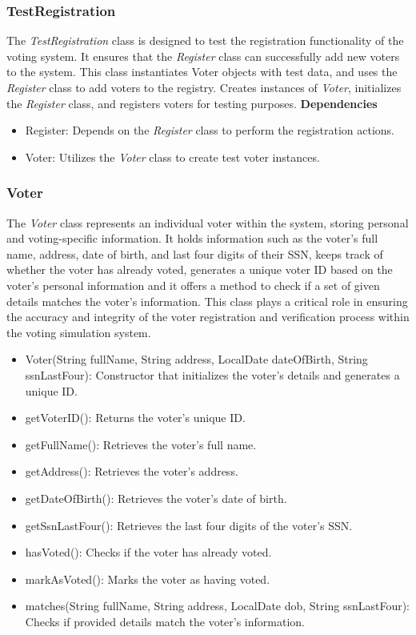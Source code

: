 \documentclass{article}
\begin{document}
\subsubsection{TestRegistration}
The \textit{TestRegistration} class is designed to test the registration functionality of the voting system. It ensures that the \textit{Register} class can successfully add new voters to the system. This class instantiates Voter objects with test data, and uses the \textit{Register} class to add voters to the registry. Creates instances of \textit{Voter}, initializes the \textit{Register} class, and registers voters for testing purposes.
\textbf{Dependencies}
\begin{itemize}
    \item Register: Depends on the \textit{Register} class to perform the registration actions.
    \item Voter: Utilizes the \textit{Voter} class to create test voter instances.
\end{itemize}

\subsubsection{Voter}
The \textit{Voter} class represents an individual voter within the system, storing personal and voting-specific information. It holds information such as the voter's full name, address, date of birth, and last four digits of their SSN, keeps track of whether the voter has already voted, generates a unique voter ID based on the voter's personal information and it offers a method to check if a set of given details matches the voter's information. This class plays a critical role in ensuring the accuracy and integrity of the voter registration and verification process within the voting simulation system.

\begin{itemize}
    \item Voter(String fullName, String address, LocalDate dateOfBirth, String ssnLastFour): Constructor that initializes the voter's details and generates a unique ID.
    \item getVoterID(): Returns the voter's unique ID.
    \item getFullName(): Retrieves the voter's full name.
    \item getAddress(): Retrieves the voter's address.
    \item getDateOfBirth(): Retrieves the voter's date of birth.
    \item getSsnLastFour(): Retrieves the last four digits of the voter's SSN.
    \item hasVoted(): Checks if the voter has already voted.
    \item markAsVoted(): Marks the voter as having voted.
    \item matches(String fullName, String address, LocalDate dob, String ssnLastFour): Checks if provided details match the voter's information.
\end{itemize}
\end{document}
